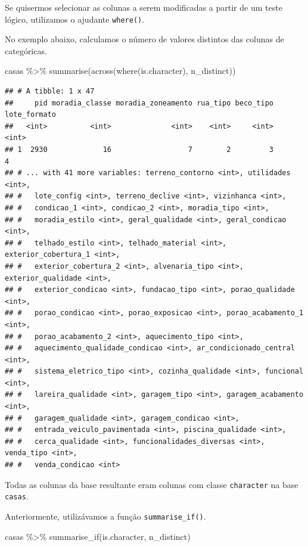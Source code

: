 \documentclass[
]{book}
\newenvironment{Shaded}{\begin{snugshade}}{\end{snugshade}}
\newcommand{\FunctionTok}[1]{\textcolor[rgb]{0.00,0.00,0.00}{#1}}
\newcommand{\NormalTok}[1]{#1}
\newcommand{\SpecialCharTok}[1]{\textcolor[rgb]{0.00,0.00,0.00}{#1}}
\begin{document}
Se quisermos selecionar as colunas a serem modificadas a partir de um teste lógico, utilizamos o ajudante \texttt{where()}.

No exemplo abaixo, calculamos o número de valores distintos das colunas de categóricas.

\begin{Shaded}
\begin{Highlighting}[]
\NormalTok{casas }\SpecialCharTok{\%\textgreater{}\%}
  \FunctionTok{summarise}\NormalTok{(}\FunctionTok{across}\NormalTok{(}\FunctionTok{where}\NormalTok{(is.character), n\_distinct))}
\end{Highlighting}
\end{Shaded}

\begin{verbatim}
## # A tibble: 1 x 47
##     pid moradia_classe moradia_zoneamento rua_tipo beco_tipo lote_formato
##   <int>          <int>              <int>    <int>     <int>        <int>
## 1  2930             16                  7        2         3            4
## # ... with 41 more variables: terreno_contorno <int>, utilidades <int>,
## #   lote_config <int>, terreno_declive <int>, vizinhanca <int>,
## #   condicao_1 <int>, condicao_2 <int>, moradia_tipo <int>,
## #   moradia_estilo <int>, geral_qualidade <int>, geral_condicao <int>,
## #   telhado_estilo <int>, telhado_material <int>, exterior_cobertura_1 <int>,
## #   exterior_cobertura_2 <int>, alvenaria_tipo <int>, exterior_qualidade <int>,
## #   exterior_condicao <int>, fundacao_tipo <int>, porao_qualidade <int>,
## #   porao_condicao <int>, porao_exposicao <int>, porao_acabamento_1 <int>,
## #   porao_acabamento_2 <int>, aquecimento_tipo <int>,
## #   aquecimento_qualidade_condicao <int>, ar_condicionado_central <int>,
## #   sistema_eletrico_tipo <int>, cozinha_qualidade <int>, funcional <int>,
## #   lareira_qualidade <int>, garagem_tipo <int>, garagem_acabamento <int>,
## #   garagem_qualidade <int>, garagem_condicao <int>,
## #   entrada_veiculo_pavimentada <int>, piscina_qualidade <int>,
## #   cerca_qualidade <int>, funcionalidades_diversas <int>, venda_tipo <int>,
## #   venda_condicao <int>
\end{verbatim}

Todas as colunas da base resultante eram colunas com classe \texttt{character} na base \texttt{casas}.

Anteriormente, utilizávamos a função \texttt{summarise\_if()}.

\begin{Shaded}
\begin{Highlighting}[]
\NormalTok{casas }\SpecialCharTok{\%\textgreater{}\%}
  \FunctionTok{summarise\_if}\NormalTok{(is.character, n\_distinct)}
\end{Highlighting}
\end{Shaded}
\end{document}
